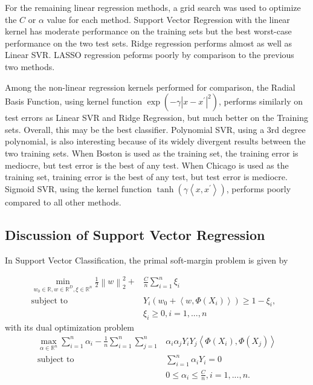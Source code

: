 \documentclass{article}
\begin{document}
For the remaining linear regression methods, a grid search was used to optimize the $C$ or $\alpha$ value for each method. Support Vector Regression with the linear kernel has moderate performance on the training sets but the best worst-case performance on the two test sets. Ridge regression performs almost as well as Linear SVR. LASSO regression peforms poorly by comparison to the previous two methods.

Among the non-linear regression kernels performed for comparison, the Radial Basis Function, using kernel function $\exp\left(-\gamma\left|x-x^\prime\right|^2\right)$, performs similarly on test errors as Linear SVR and Ridge Regression, but much better on the Training sets. Overall, this may be the best classifier. Polynomial SVR, using a 3rd degree polynomial, is also interesting because of its widely divergent results between the two training sets. When Boston is used as the training set, the training error is mediocre, but test error is the best of any test. When Chicago is used as the training set, training error is the best of any test, but test error is mediocre. Sigmoid SVR, using the kernel function $\tanh\left(\gamma\left<x, x^\prime\right>\right)$, performs poorly compared to all other methods. 

\subsection{Discussion of Support Vector Regression}

In Support Vector Classification, the primal soft-margin problem is given by 

\begin{align*}
\min_{w_0\in\mathbb{R}, w\in\mathbb{R}^D, \xi\in\mathbb{R}^n}\frac{1}{2}\left\lVert w\right\rVert_2^2 + &\frac{C}{n}\sum_{i=1}^n\xi_i& \\ 
\text{subject to }&Y_i\left(w_0 + \left<w,\Phi(X_i)\right>\right) \geq 1 - \xi_i, \\
&\xi_i\geq 0, i = 1, ..., n
\end{align*}
with its dual optimization problem
\begin{align*}
\max_{\alpha\in\mathbb{R}^n}\sum_{i=1}^n\alpha_i - \frac{1}{n}\sum_{i=1}^n\sum_{j=1}^n&\alpha_i\alpha_jY_iY_j\left<\Phi(X_i), \Phi(X_j)\right> \\
\text{subject to }&\sum_{i=1}^n\alpha_iY_i=0 \\
&0 \leq \alpha_i \leq \frac{C}{n}, i=1, ... , n.
\end{align*}
\end{document}
